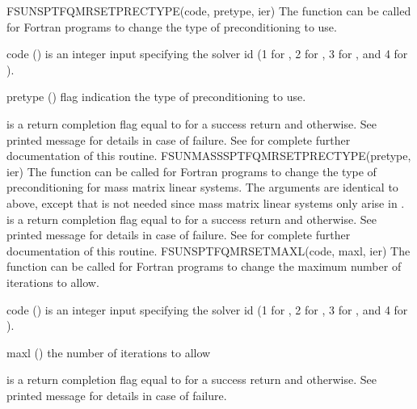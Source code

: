 {
  FSUNSPTFQMRSETPRECTYPE(code, pretype, ier)
}
{
  The function  can be called for Fortran
  programs to change the type of preconditioning to use.
}
{
  \begin{args}[pretype]
  \item[code] ()
    is an integer input specifying the solver id (1 for {\cvode}, 2
    for {\ida}, 3 for {\kinsol}, and 4 for {\arkode}).
  \item[pretype] ()
    flag indication the type of preconditioning to use.
  \end{args}
}
{
   is a  return completion flag equal to  for a success
  return and  otherwise. See printed message for details in case
  of failure.
}
{
  See  for complete further documentation of
  this routine.
}
{
  FSUNMASSSPTFQMRSETPRECTYPE(pretype, ier)
}
{
  The function  can be called for Fortran
  programs to change the type of preconditioning for mass matrix
  linear systems.
}
{
  The arguments are identical to  above,
  except that  is not needed since mass matrix linear systems
  only arise in {\arkode}.
}
{
   is a  return completion flag equal to  for a success
  return and  otherwise. See printed message for details in case
  of failure.
}
{
  See  for complete further documentation of
  this routine.
}
{
  FSUNSPTFQMRSETMAXL(code, maxl, ier)
}
{
  The function  can be called for Fortran
  programs to change the maximum number of iterations to allow.
}
{
  \begin{args}[maxl]
  \item[code] ()
    is an integer input specifying the solver id (1 for {\cvode}, 2
    for {\ida}, 3 for {\kinsol}, and 4 for {\arkode}).
  \item[maxl] ()
    the number of iterations to allow
  \end{args}
}
{
   is a  return completion flag equal to  for a success
  return and  otherwise. See printed message for details in case
  of failure.
}
